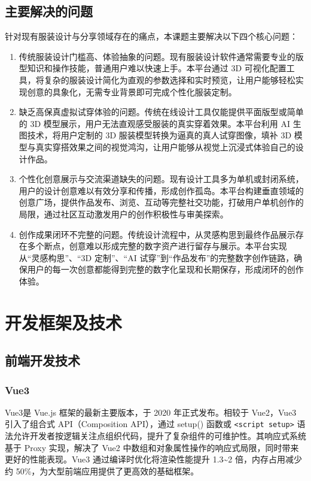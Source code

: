 \documentclass[twoside]{thesis-cls-Miya} %
\begin{document}
\section{主要解决的问题}
针对现有服装设计与分享领域存在的痛点，本课题主要解决以下四个核心问题：
\begin{enumerate}[label=(\arabic*)]
	\item 传统服装设计门槛高、体验抽象的问题。现有服装设计软件通常需要专业的版型知识和操作技能，普通用户难以快速上手。本平台通过 3D 可视化配置工具，将复杂的服装设计简化为直观的参数选择和实时预览，让用户能够轻松实现创意的具象化，无需专业背景即可完成个性化服装定制。
	\item 缺乏高保真虚拟试穿体验的问题。传统在线设计工具仅能提供平面版型或简单的 3D 模型展示，用户无法直观感受服装的真实穿着效果。本平台利用 AI 生图技术，将用户定制的 3D 服装模型转换为逼真的真人试穿图像，填补 3D 模型与真实穿搭效果之间的视觉鸿沟，让用户能够从视觉上沉浸式体验自己的设计作品。
	\item 个性化创意展示与交流渠道缺失的问题。现有设计工具多为单机或封闭系统，用户的设计创意难以有效分享和传播，形成创作孤岛。本平台构建垂直领域的创意广场，提供作品发布、浏览、互动等完整社交功能，打破用户单机创作的局限，通过社区互动激发用户的创作积极性与审美探索。
	\item 创作成果闭环不完整的问题。传统设计流程中，从灵感构思到最终作品展示存在多个断点，创意难以形成完整的数字资产进行留存与展示。本平台实现从“灵感构思”、“3D 定制”、“AI 试穿”到“作品发布”的完整数字创作链路，确保用户的每一次创意都能得到完整的数字化呈现和长期保存，形成闭环的创作体验。
\end{enumerate}

\chapter{开发框架及技术}%

\section{前端开发技术}

\subsection{Vue3}
Vue3是 Vue.js 框架的最新主要版本，于 2020 年正式发布\cite{vue3_docs}。相较于 Vue2，Vue3 引入了组合式 API（Composition API），通过 setup() 函数或 \texttt{<script setup>} 语法允许开发者按逻辑关注点组织代码，提升了复杂组件的可维护性。其响应式系统基于 Proxy 实现，解决了 Vue2 中数组和对象属性操作的响应式局限，同时带来更好的性能表现。Vue3 通过编译时优化将渲染性能提升 1.3\textasciitilde2 倍，内存占用减少约 50\%，为大型前端应用提供了更高效的基础框架。
\end{document}
